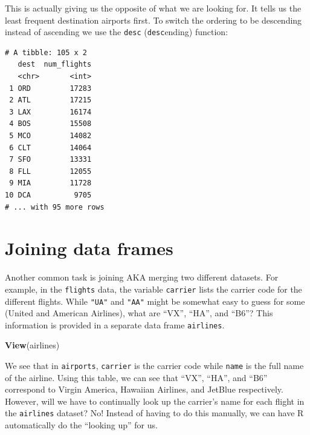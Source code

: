 \documentclass[12pt,]{krantz}
\makeatletter
\newenvironment{Shaded}{\begin{snugshade}}{\end{snugshade}}
\newcommand{\KeywordTok}[1]{\textcolor[rgb]{0.27,0.27,0.27}{\textbf{#1}}}
\newcommand{\StringTok}[1]{\textcolor[rgb]{0.5,0.5,0.5}{#1}}
\newcommand{\OperatorTok}[1]{\textcolor[rgb]{0.43,0.43,0.43}{\textbf{#1}}}
\newcommand{\NormalTok}[1]{#1}
\newenvironment{kframe}{%
\medskip{}
\setlength{\fboxsep}{.8em}
 \def\at@end@of@kframe{}%
 \ifinner\ifhmode%
  \def\at@end@of@kframe{\end{minipage}}%
  \begin{minipage}{\columnwidth}%
 \fi\fi%
 \def\FrameCommand##1{\hskip\@totalleftmargin \hskip-\fboxsep
 \colorbox{shadecolor}{##1}\hskip-\fboxsep
     \hskip-\linewidth \hskip-\@totalleftmargin \hskip\columnwidth}%
 \MakeFramed {\advance\hsize-\width
   \@totalleftmargin\z@ \linewidth\hsize
   \@setminipage}}%
 {\par\unskip\endMakeFramed%
 \at@end@of@kframe}
\renewenvironment{Shaded}{\begin{kframe}}{\end{kframe}}
\theoremstyle{definition}
\theoremstyle{definition}
\theoremstyle{definition}
\theoremstyle{remark}
\makeatother
\begin{document}
This is actually giving us the opposite of what we are looking for. It
tells us the least frequent destination airports first. To switch the
ordering to be descending instead of ascending we use the \texttt{desc}
(\texttt{desc}ending) function:

\begin{Shaded}
\end{Shaded}

\begin{verbatim}
# A tibble: 105 x 2
   dest  num_flights
   <chr>       <int>
 1 ORD         17283
 2 ATL         17215
 3 LAX         16174
 4 BOS         15508
 5 MCO         14082
 6 CLT         14064
 7 SFO         13331
 8 FLL         12055
 9 MIA         11728
10 DCA          9705
# ... with 95 more rows
\end{verbatim}

\section{Joining data frames}\label{joins}

Another common task is joining AKA merging two different datasets. For
example, in the \texttt{flights} data, the variable \texttt{carrier}
lists the carrier code for the different flights. While \texttt{"UA"}
and \texttt{"AA"} might be somewhat easy to guess for some (United and
American Airlines), what are ``VX'', ``HA'', and ``B6''? This
information is provided in a separate data frame \texttt{airlines}.

\begin{Shaded}
\begin{Highlighting}[]
\KeywordTok{View}\NormalTok{(airlines)}
\end{Highlighting}
\end{Shaded}

We see that in \texttt{airports}, \texttt{carrier} is the carrier code
while \texttt{name} is the full name of the airline. Using this table,
we can see that ``VX'', ``HA'', and ``B6'' correspond to Virgin America,
Hawaiian Airlines, and JetBlue respectively. However, will we have to
continually look up the carrier's name for each flight in the
\texttt{airlines} dataset? No! Instead of having to do this manually, we
can have R automatically do the ``looking up'' for us.
\end{document}
